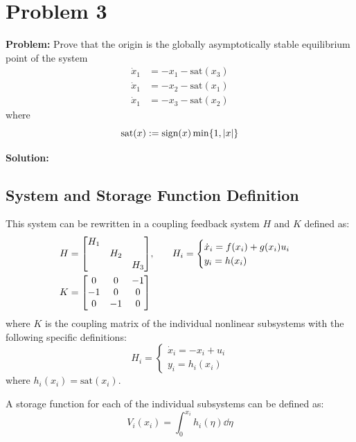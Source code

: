 \documentclass[letter]{article}
\numberwithin{equation}{section}
\newcommand{\sat}{\text{sat}}
\newcommand{\sign}{\text{sign}}
\begin{document}
\newpage
\section{Problem 3}
\textbf{Problem:}
Prove that the origin is the globally asymptotically stable equilibrium point of the system
\begin{equation}
	\begin{aligned}
		\dot{x}_1 &= -x_1 - \sat(x_3)\\
		\dot{x}_1 &= -x_2 - \sat(x_1)\\
		\dot{x}_1 &= -x_3 - \sat(x_2)
	\end{aligned}
\end{equation}
where
\begin{equation}
	\sat(x) := \sign(x) \min\{1,\abs{x}\}
\end{equation}

\noindent
\textbf{Solution:}
\subsection{System and Storage Function Definition}
This system can be rewritten in a coupling feedback system $H$ and $K$ defined as:
\begin{align}
	H &= \mqty[\dmat{H_1}{H_2}{H_3}], \hspace{0.25in}
	H_i
	=\begin{cases}
		\dot{x}_i = f(x_i) + g(x_i) u_i\\
		y_i = h(x_i)
	\end{cases}\\
	K &= \mqty[	 0 	& 0 &-1\\
	-1 	& 0 & 0\\
	0 	&-1 & 0]
\end{align}
where $K$ is the coupling matrix of the individual nonlinear subsystems with the following specific definitions:
\begin{equation}
	H_i =
	\begin{cases}
		\dot{x}_i = -x_i + u_i\\
		y_i = h_i(x_i)
	\end{cases}
\end{equation}
where $h_i(x_i) = \sat(x_i)$.

A storage function for each of the individual subsystems can be defined as:
\begin{equation}
	V_i(x_i) = \int_{0}^{x_i} h_i(\eta) \dd \eta
\end{equation}
\end{document}
